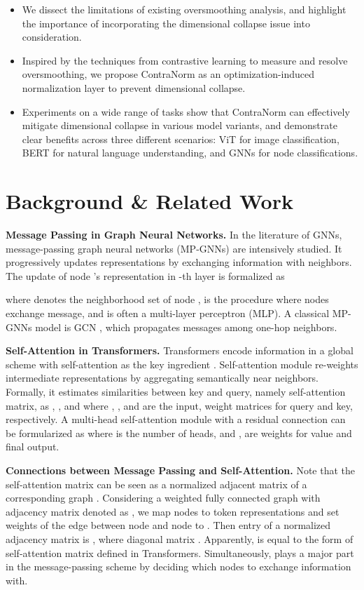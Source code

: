 \documentclass{article}
\theoremstyle{definition}
\theoremstyle{remark}
\theoremstyle{theorem}
\begin{document}
\begin{itemize}
    \item We dissect the limitations of existing oversmoothing analysis, and highlight the importance of incorporating the dimensional collapse issue into consideration.
    \item Inspired by the techniques from contrastive learning to measure and resolve oversmoothing, we propose ContraNorm as an optimization-induced normalization layer to prevent dimensional collapse.
    \item Experiments on a wide range of tasks show that ContraNorm can effectively mitigate dimensional collapse in various model variants, and demonstrate clear benefits across three different scenarios: ViT for image classification, BERT for natural language understanding, and GNNs for node classifications. 
\end{itemize}




\section{Background \& Related Work}

\textbf{Message Passing in Graph Neural Networks.} In the literature of GNNs, message-passing graph neural networks (MP-GNNs) are intensively studied. It progressively updates representations by exchanging information with neighbors. The update of node 's representation in -th layer is formalized as

where  denotes the neighborhood set of node ,  is the procedure where nodes exchange message, and  is often a multi-layer perceptron (MLP). A classical MP-GNNs model is GCN \citep{kipf2016semi}, which propagates messages among one-hop neighbors.

\textbf{Self-Attention in Transformers.} Transformers encode information in a global scheme with self-attention as the key ingredient \citep{vaswani2017attention}. Self-attention module re-weights intermediate representations by aggregating semantically near neighbors. Formally, it estimates similarities between key and query, namely self-attention matrix, as , , and  where , , and  are the input, weight matrices for query and key, respectively. A multi-head self-attention module with a residual connection can be formularized as 
where  is the number of heads, and ,  are weights for value and final output.

\textbf{Connections between Message Passing and Self-Attention.}
Note that the self-attention matrix can be seen as a normalized adjacent matrix of a corresponding graph \citep{shi2022revisiting}. Considering a weighted fully connected graph  with adjacency matrix denoted as , we map nodes to token representations and set weights of the edge between node  and node  to . Then  entry of a normalized adjacency matrix is , where diagonal matrix . Apparently,  is equal to the form of self-attention matrix defined in Transformers. Simultaneously,  plays a major part in the message-passing scheme by deciding which nodes to exchange information with.
\end{document}
